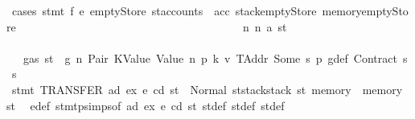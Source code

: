 \begin{isabellebody}
\ {\isacharparenleft}{\kern0pt}cases\ {\isachardoublequoteopen}stmt\ f\ e{\isacharprime}{\kern0pt}\ emptyStore\ {\isacharparenleft}{\kern0pt}st{\isacharprime}{\kern0pt}{\isacharprime}{\kern0pt}{\isacharprime}{\kern0pt}{\isasymlparr}accounts\ {\isacharcolon}{\kern0pt}{\isacharequal}{\kern0pt}\ acc{\isacharcomma}{\kern0pt}\ stack{\isacharcolon}{\kern0pt}{\isacharequal}{\kern0pt}emptyStore{\isacharcomma}{\kern0pt}\ memory{\isacharcolon}{\kern0pt}{\isacharequal}{\kern0pt}emptyStore{\isasymrparr}{\isacharparenright}{\kern0pt}{\isachardoublequoteclose}{\isacharparenright}{\kern0pt}\isanewline
\ \ \ \ \ \ \ \ \ \ \ \ \ \ \ \ \ \ \ \ \ \ \ \ \ \ \ \ \ \ \ \ \ \ \ \ \ \ \isamarkupfalse%
\ n{}{\isacharcolon}{\kern0pt}\ {\isacharparenleft}{\kern0pt}n\ a\ st{\isacharprime}{\kern0pt}{\isacharprime}{\kern0pt}{\isacharprime}{\kern0pt}{\isacharprime}{\kern0pt}{\isacharparenright}{\kern0pt}\isanewline
\ \ \ \ \ \ \ \ \ \ \ \ \ \ \ \ \ \ \ \ \ \ \ \ \ \ \ \ \ \ \ \ \ \ \ \ \ \ \isamarkupfalse%
\ {}{\isacharparenleft}{\kern0pt}{}{\isacharparenright}{\kern0pt}\ {\isacharbackquoteopen}{\isasymnot}\ gas\ st\ {\isasymle}\ g{\isacharbackquoteclose}\ n\ Pair\ KValue\ Value\ n{}\ p{}\ k{}\ v{}\ TAddr\ Some\ s{}\ p{}\ g{\isacharunderscore}{\kern0pt}def\ Contract\ s{}\ s{}\isanewline
\ \ \ \ \ \ \ \ \ \ \ \ \ \ \ \ \ \ \ \ \ \ \ \ \ \ \ \ \ \ \ \ \ \ \ \ \ \ \isamarkupfalse%
\ {\isachardoublequoteopen}stmt\ {\isacharparenleft}{\kern0pt}TRANSFER\ ad\ ex{\isacharparenright}{\kern0pt}\ e\ cd\ st\ {\isacharequal}{\kern0pt}\ Normal\ {\isacharparenleft}{\kern0pt}{\isacharparenleft}{\kern0pt}{\isacharparenright}{\kern0pt}{\isacharcomma}{\kern0pt}st{\isacharprime}{\kern0pt}{\isacharprime}{\kern0pt}{\isacharprime}{\kern0pt}{\isacharprime}{\kern0pt}{\isasymlparr}stack{\isacharcolon}{\kern0pt}{\isacharequal}{\kern0pt}stack\ st{\isacharprime}{\kern0pt}{\isacharprime}{\kern0pt}{\isacharprime}{\kern0pt}{\isacharcomma}{\kern0pt}\ memory\ {\isacharcolon}{\kern0pt}{\isacharequal}{\kern0pt}\ memory\ st{\isacharprime}{\kern0pt}{\isacharprime}{\kern0pt}{\isacharprime}{\kern0pt}{\isasymrparr}{\isacharparenright}{\kern0pt}{\isachardoublequoteclose}\ \isamarkupfalse%
\ e{\isacharprime}{\kern0pt}{\isacharunderscore}{\kern0pt}def\ stmt{\isachardot}{\kern0pt}psimps{\isacharparenleft}{\kern0pt}{}{\isacharparenright}{\kern0pt}{\isacharbrackleft}{\kern0pt}of\ ad\ ex\ e\ cd\ st{\isacharbrackright}{\kern0pt}\ st{\isacharprime}{\kern0pt}{\isacharunderscore}{\kern0pt}def\ st{\isacharprime}{\kern0pt}{\isacharprime}{\kern0pt}{\isacharunderscore}{\kern0pt}def\ st{\isacharprime}{\kern0pt}{\isacharprime}{\kern0pt}{\isacharprime}{\kern0pt}{\isacharunderscore}{\kern0pt}def\ \isamarkupfalse%

\end{isabellebody}
